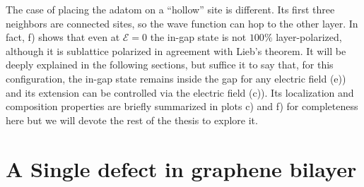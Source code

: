 \bigskip


The case of placing the adatom on a ``hollow'' site is different. Its first three neighbors are connected sites, so the wave function can hop to the other layer. In fact, f) shows that even at $\mathcal{E}=0$ the in-gap state is not $100\%$ layer-polarized, although it is sublattice polarized in agreement with Lieb's theorem.
It will be deeply explained in the following sections, but suffice it to say that, for this configuration, the in-gap state remains inside the gap for any electric field (e)) and its extension can be controlled via the electric field (c)).
Its localization and composition properties are briefly summarized in plots c) and f) for completeness here but we will devote the rest of the thesis to explore it.




\section{A Single defect in graphene bilayer}

